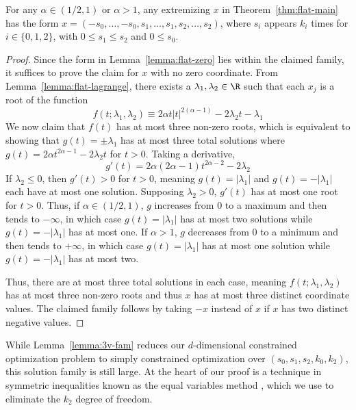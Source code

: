\documentclass[11pt]{article}
\begin{document}
\begin{lemma}\label{lemma:3v-fam}
   For any $\alpha\in (1/2,1)$ or $\alpha > 1$, any extremizing $x$ in Theorem~\ref{thm:flat-main} has the form $x=(-s_0,\dots,-s_0,s_1,\dots,s_1,s_2,\dots,s_2)$, where $s_i$ appears $k_i$ times for $i\in \{0,1,2\}$, with $0\leq  s_1\leq s_2$ and $0\leq s_0$. 
\end{lemma}
\begin{proof}
Since the form in Lemma~\ref{lemma:flat-zero} lies within the claimed family, it suffices to prove the claim for $x$ with no zero coordinate.
From Lemma~\ref{lemma:flat-lagrange}, there exists a $\lambda_1,\lambda_2\in \R$ such that each $x_j$ is a root of the function
\begin{equation}
    f(t;\lambda_1,\lambda_2)\equiv 2\alpha t |t|^{2(\alpha-1)}-2\lambda_2 t-\lambda_1
\end{equation}
We now claim that $f(t)$ has at most three non-zero roots, which is equivalent to showing that $g(t)=\pm \lambda_1$ has at most three total solutions where $g(t)=2\alpha t^{2\alpha-1}-2\lambda_2 t$ for $t>0$. Taking a derivative,
\begin{equation}
    g'(t)=2\alpha (2\alpha-1)t^{2\alpha-2}-2\lambda_2
\end{equation}
If $\lambda_2\leq 0$, then $g'(t)>0$ for $t>0$, meaning $g(t)=|\lambda_1|$ and $g(t)=-|\lambda_1|$ each have at most one solution. Supposing $\lambda_2>0$, $g'(t)$ has at most one root for $t>0$. Thus, if $\alpha \in (1/2,1)$, $g$ increases from $0$ to a maximum and then tends to $-\infty$, in which case $g(t)=|\lambda_1|$ has at most two solutions while $g(t)=-|\lambda_1|$ has at most one. If $\alpha >1$, $g$ decreases from $0$ to a minimum and then tends to $+\infty$, in which case $g(t)=|\lambda_1|$ has at most one solution while $g(t)=-|\lambda_1|$ has at most two. 

Thus, there are at most three total solutions in each case, meaning $f(t;\lambda_1,\lambda_2)$ has at most three non-zero roots and thus $x$ has at most three distinct coordinate values. The claimed family follows by taking $-x$ instead of $x$ if $x$ has two distinct negative values.
\end{proof}

While Lemma~\ref{lemma:3v-fam} reduces our $d$-dimensional constrained optimization problem to simply constrained optimization over $(s_0,s_1,s_2,k_0,k_2)$, this solution family is still large. At the heart of our proof is a technique in symmetric inequalities known as the equal variables method \citep{cirtoaje2006algebraic}, which we use to eliminate the $k_2$ degree of freedom. 
\end{document}
